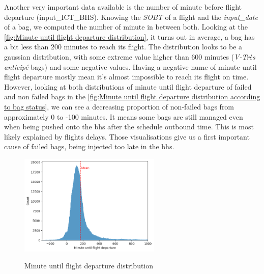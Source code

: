 \documentclass[12pt]{article}
\begin{document}
Another very important data available is the number of minute before flight departure (input\_ICT\_BHS). Knowing the \textit{SOBT} of a flight and the \textit{input\_date} of a bag, we computed the number of minute in between both. Looking at the \autoref{fig:Minute until flight departure distribution}, it turns out in average, a bag has a bit less than 200 minutes to reach its flight. The distribution looks to be a gaussian distribution, with some extreme value higher than 600 minutes (\textit{V-Très anticipé} bags) and some negative values. Having a negative nume of minute until flight departure mostly mean it's almost impossible to reach its flight on time. However, looking at both distributions of minute until flight departure of failed and non failed bags in the \autoref{fig:Minute until flight departure distribution according to bag status}, we can see a decreasing proportion of non-failed bags from approximately 0 to -100 minutes. It means some bags are still managed even when being pushed onto the \acrshort{bhs} after the schedule outbound time. This is most likely explained by flights delays. Those visualisations give us a first important cause of failed bags, being injected too late in the \acrshort{bhs}.

\begin{figure}[h]
    \centering
    \includegraphics[width=0.6\textwidth]{Minute until flight departure.png}\\
    \caption{Minute until flight departure distribution}
    \label{fig:Minute until flight departure distribution}
\end{figure}
\FloatBarrier
\end{document}
